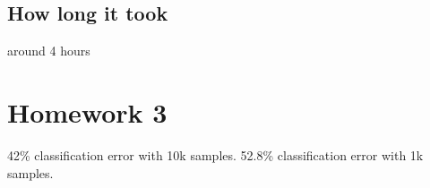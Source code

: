 \documentclass{article}
\begin{document}
 \quad
{} \quad

\subsection{How long it took}
around 4 hours


\section{Homework 3}
42\% classification error with 10k samples.
52.8\% classification error with 1k samples.
\end{document}
